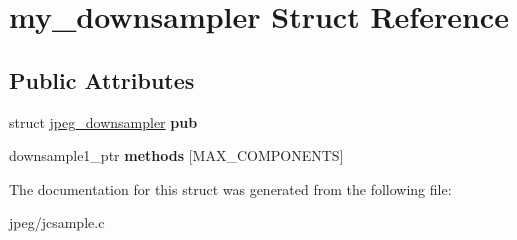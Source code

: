 \hypertarget{structmy__downsampler}{}\section{my\+\_\+downsampler Struct Reference}
\label{structmy__downsampler}
\subsection*{Public Attributes}
\begin{DoxyCompactItemize}
\item 
struct \hyperlink{structjpeg__downsampler}{jpeg\+\_\+downsampler} {\bfseries pub}\hypertarget{structmy__downsampler_a3ace227dd4fd9fdf8e8fe542ca6503c3}{}\label{structmy__downsampler_a3ace227dd4fd9fdf8e8fe542ca6503c3}

\item 
downsample1\+\_\+ptr {\bfseries methods} \mbox{[}M\+A\+X\+\_\+\+C\+O\+M\+P\+O\+N\+E\+N\+TS\mbox{]}\hypertarget{structmy__downsampler_a6e74bc63d21fbd97d92dc36f65011a75}{}\label{structmy__downsampler_a6e74bc63d21fbd97d92dc36f65011a75}

\end{DoxyCompactItemize}


The documentation for this struct was generated from the following file\+:\begin{DoxyCompactItemize}
\item 
jpeg/jcsample.\+c\end{DoxyCompactItemize}
